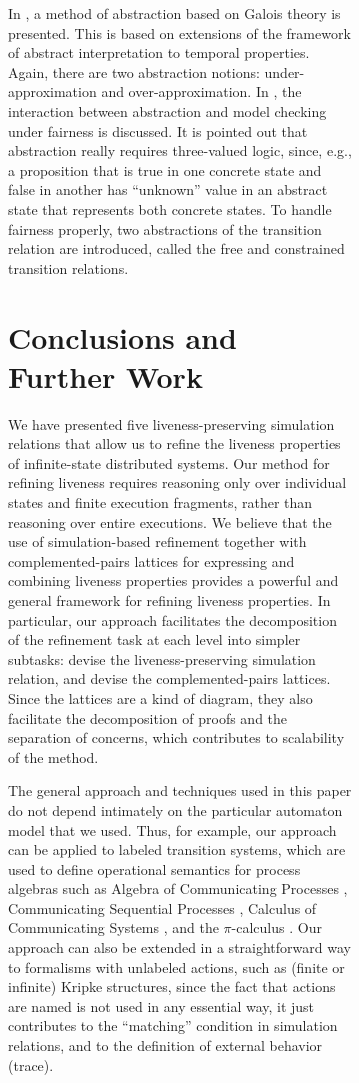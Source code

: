 \documentclass[11pt]{article}
\begin{document}
\begin{figure}[htb]
\begin{figure}[htb]
In \cite{Ur98}, a method of abstraction based on Galois theory is presented. 
This is based on extensions of the framework of abstract
interpretation \cite{CC77} to temporal properties. 
Again, there are two abstraction notions: under-approximation and
over-approximation.
In \cite{DGG00}, the interaction between abstraction and model
checking under fairness is discussed.  
It is pointed out that abstraction really requires three-valued logic,
since, e.g., a proposition that is true in one concrete state and
false in another has ``unknown'' value in an abstract state
that represents both concrete states.
To handle fairness properly, two abstractions of the transition
relation are introduced, called the free and constrained transition
relations. 



\section{Conclusions and Further Work}
\label{sec:conc}

We have presented five liveness-preserving simulation relations that
allow us to refine the liveness properties of infinite-state
distributed systems.
Our method for refining liveness requires reasoning only over
individual states and finite execution fragments, rather than
reasoning over entire executions.  We believe that the use of
simulation-based refinement together with complemented-pairs lattices
for expressing and combining liveness properties provides a
powerful and general framework for refining liveness properties.
In particular, our approach facilitates the decomposition of the
refinement task at each level into simpler subtasks: devise the
liveness-preserving simulation relation, and devise the
complemented-pairs lattices. Since the lattices are a kind of diagram,
they also facilitate the decomposition of proofs and the separation of
concerns, which contributes to scalability of the method.

The general approach and techniques used in this paper do not depend
intimately on the particular automaton model that we used.  Thus, for
example, our approach can be applied to labeled transition systems,
which are used to define operational semantics for process algebras
such as Algebra of Communicating Processes \cite{BW90},
Communicating Sequential Processes \cite{Hoa85},
Calculus of Communicating Systems \cite{Mil89}, and the $\pi$-calculus \cite{Mil99}.
Our approach can also be extended in a
straightforward way to formalisms with unlabeled actions, such as
(finite or infinite) Kripke structures, 
since the fact that actions are named is not used in any essential
way, it just contributes to the ``matching'' condition in simulation
relations, and to the definition of external behavior (trace).




\end{figure}
\end{figure}
\end{document}
